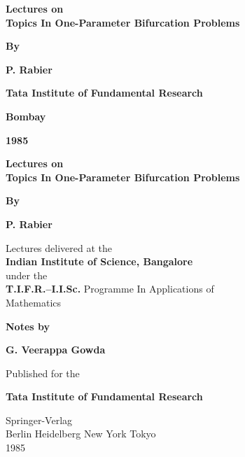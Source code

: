 \thispagestyle{empty}

\begin{center}
{\Large\bf Lectures on}\\[5pt]
{\Large\bf Topics In One-Parameter Bifurcation Problems}
\vfill

{\bf By}
\medskip

{\large\bf P. Rabier}
\vfill

{\bf Tata Institute of Fundamental Research}

{\bf Bombay}

{\bf 1985}
\end{center}

\eject

\thispagestyle{empty}

\begin{center}
{\Large\bf Lectures on}\\[5pt]
{\Large\bf Topics In One-Parameter Bifurcation Problems}
\vfill

{\bf By}
\medskip

{\large\bf P. Rabier}
\vfill

Lectures delivered at the\\
{\bf Indian Institute of Science, Bangalore}\\
under the \\
{\bf T.I.F.R.--I.I.Sc.} Programme In  Applications of\\
Mathematics
\vfill

{\bf Notes by}
\medskip

{\large\bf G. Veerappa  Gowda}
\vfill

Published for the 
\medskip

{\bf Tata Institute of Fundamental Research}
\vfill

Springer-Verlag\\
Berlin Heidelberg New York Tokyo\\
1985
\end{center}

\eject

\thispagestyle{empty}

